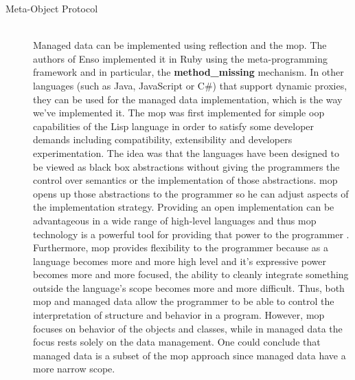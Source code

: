 \begin{description}

  \item[Meta-Object Protocol]~\\
  Managed data can be implemented using reflection and the \ac{mop}. 
  The authors of Enso \cite{loh2012managed} implemented it in Ruby using the meta-programming framework and in particular, the \textbf{method\_missing} mechanism. 
  In other languages (such as Java, JavaScript or C\#) that support dynamic proxies, they can be used for the managed data implementation, which is the way we've implemented it.
  The \ac{mop} \cite{kiczales1991art} was first implemented for simple \ac{oop} capabilities of the Lisp language in order to satisfy some developer demands including compatibility, extensibility and developers experimentation. 
  The idea was that the languages have been designed to be viewed as black box abstractions without giving the programmers the control over semantics or the implementation of those abstractions. 
  \ac{mop} opens up those abstractions to the programmer so he can adjust aspects of the implementation strategy. 
  Providing an open implementation can be advantageous in a wide range of high-level languages and thus \ac{mop} technology is a powerful tool for providing that power to the programmer \cite{kiczales1991art}. 
  Furthermore, \ac{mop} provides flexibility to the programmer because as a language becomes more and more high level and it's expressive power becomes more and more focused, the ability to cleanly integrate something outside the language's scope becomes more and more difficult. 
  Thus, both \ac{mop} and managed data allow the programmer to be able to control the interpretation of structure and behavior in a program.
  However, \ac{mop} focuses on behavior of the objects and classes, while in managed data the focus rests solely on the data management.
  One could conclude that managed data is a subset of the \ac{mop} approach since managed data have a more narrow scope.


\end{description}
